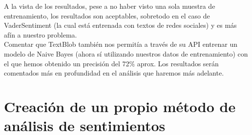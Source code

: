 \documentclass[a4paper,12pt]{report}
\begin{document}
\vspace{2mm}
\begin{table}[htbp!]
\centering
{}
\caption{Resultados para TextBlob}
\end{table}

A la vista de los resultados, pese a no haber visto una sola muestra de entrenamiento, los resultados son aceptables, sobretodo en el caso de VaderSentiment (la cual está entrenada con textos de redes sociales) y es más afín a nuestro problema.
\vspace{2mm}\\
Comentar que TextBlob también nos permitía a través de su API entrenar un modelo de Naive Bayes (ahora sí utilizando nuestros datos de entrenamiento) con el que hemos obtenido un precisión del 72\% aprox. Los resultados serán comentados más en profundidad en el análisis que haremos más adelante. 

\clearpage

\section{Creación de un propio método de análisis de sentimientos}
\end{document}
